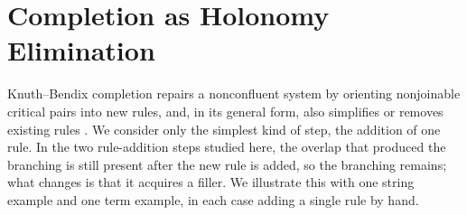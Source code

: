 \section{Completion as Holonomy Elimination}
\label{sec:completion-holonomy}

Knuth--Bendix completion repairs a nonconfluent system by orienting nonjoinable critical pairs into new rules, and, in its general form, also simplifies or removes existing rules \cite{KnuthBendix1970,DershowitzJouannaud1990,BaaderNipkow1998}. We consider only the simplest kind of step, the addition of one rule. In the two rule-addition steps studied here, the overlap that produced the branching is still present after the new rule is added, so the branching remains; what changes is that it acquires a filler. We illustrate this with one string example and one term example, in each case adding a single rule by hand.

